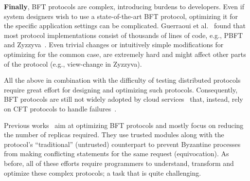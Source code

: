 {\bf Finally}, BFT protocols are complex, introducing burdens to developers. Even if system designers wish to use a state-of-the-art BFT protocol, optimizing it for the specific application settings can be complicated. 
Guerraoui et al.~\cite{10.1145/2658994} found that most protocol implementations consist of thousands of lines of code, e.g., PBFT~\cite{Castro:2002} and Zyzzyva~\cite{10.1145/1658357.1658358}. Even trivial changes or intuitively simple modifications for optimizing for the common case, are extremely hard and might affect other parts of the protocol (e.g., view-change in Zyzzyva).

All the above in combination with the difficulty of testing distributed protocols~\cite{Chandra2007PaxosML} require great effort for designing and optimizing such protocols. Consequently, BFT protocols are still not widely adopted by cloud services~\cite{bft-time-is-now, 10.1145/1711475.1711494} that, instead, rely on CFT protocols to handle failures~\cite{Hunt:2010,etcd, zippy, 51, redis}.




Previous works~\cite{minBFT, hybster, DBLP:journals/corr/LiuLKA16a, A2M, 10.1145/2168836.2168866} aim at optimizing BFT protocols and mostly focus on reducing the number of replicas required. They use trusted modules along with the protocol's ``traditional'' (untrusted) counterpart to prevent Byzantine processes from making conflicting statements for the same request (equivocation). As before, all of these efforts require programmers to understand, transform and optimize these complex protocols; a task that is quite challenging.%





